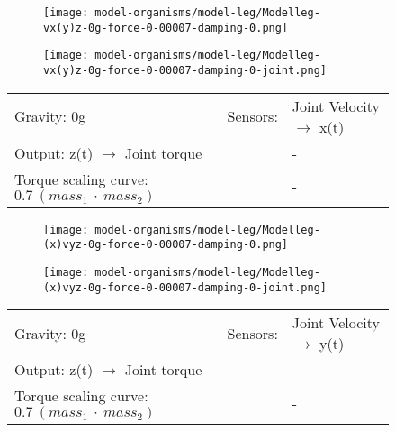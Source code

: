 \documentclass[main]{subfiles}
\begin{document}
\begin{figure}[H]
	\centering
		\begin{subfigure}[c]{0.45\textwidth}
	\texttt{[image: model-organisms/model-leg/Modelleg-vx(y)z-0g-force-0-00007-damping-0.png]}
		\end{subfigure}
	\begin{subfigure}[c]{0.45\textwidth}
	\texttt{[image: model-organisms/model-leg/Modelleg-vx(y)z-0g-force-0-00007-damping-0-joint.png]}
		\end{subfigure}
	\caption[Limited chaotic controller controlling model leg]{}
	\begin{tabular}{l|ll}
	\hline 
	Gravity: 0g  & Sensors: & Joint Velocity \(\rightarrow\) x(t)\\
	 Output: z(t) \(\rightarrow\) Joint torque & & - \\
	  Torque scaling curve: \(0.7~(mass_1~\cdot~mass_2)\) & & - \\
	  \hline
	\end{tabular}
	\label{figure:limited-model-leg3}
\end{figure}

\begin{figure}[H]
	\centering
		\begin{subfigure}[c]{0.45\textwidth}
	\texttt{[image: model-organisms/model-leg/Modelleg-(x)vyz-0g-force-0-00007-damping-0.png]}
		\end{subfigure}
	\begin{subfigure}[c]{0.45\textwidth}
	\texttt{[image: model-organisms/model-leg/Modelleg-(x)vyz-0g-force-0-00007-damping-0-joint.png]}
		\end{subfigure}
	\caption[Limited chaotic controller controlling model leg]{}
	\begin{tabular}{l|ll}
	\hline 
	Gravity: 0g  & Sensors: & Joint Velocity \(\rightarrow\) y(t)\\
	 Output: z(t) \(\rightarrow\) Joint torque &  & - \\
	  Torque scaling curve: \(0.7~(mass_1~\cdot~mass_2)\) & & - \\
	  \hline
	\end{tabular}

	\label{figure:limited-model-leg4}
\end{figure}
\end{document}
